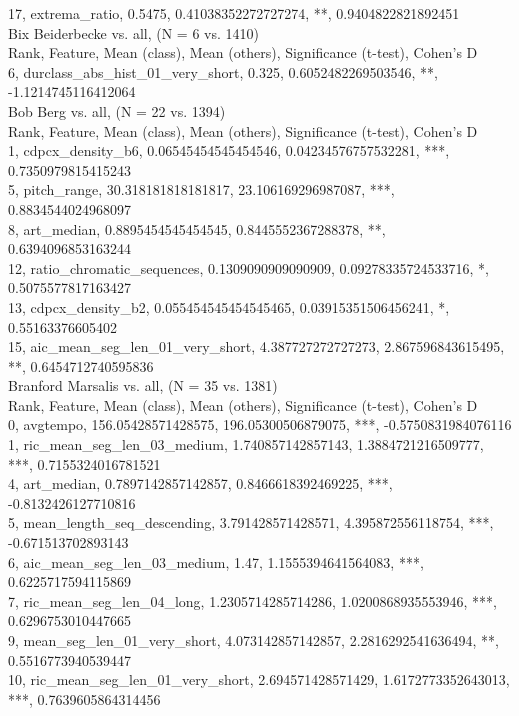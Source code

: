 17, extrema_ratio, 0.5475, 0.41038352272727274, **, 0.9404822821892451\\
Bix Beiderbecke vs. all, (N = 6 vs. 1410)\\
Rank, Feature, Mean (class), Mean (others), Significance (t-test), Cohen's D\\
6, durclass_abs_hist_01_very_short, 0.325, 0.6052482269503546, **, -1.1214745116412064\\
Bob Berg vs. all, (N = 22 vs. 1394)\\
Rank, Feature, Mean (class), Mean (others), Significance (t-test), Cohen's D\\
1, cdpcx_density_b6, 0.06545454545454546, 0.04234576757532281, ***, 0.7350979815415243\\
5, pitch_range, 30.318181818181817, 23.106169296987087, ***, 0.8834544024968097\\
8, art_median, 0.8895454545454545, 0.8445552367288378, **, 0.6394096853163244\\
12, ratio_chromatic_sequences, 0.1309090909090909, 0.09278335724533716, *, 0.5075577817163427\\
13, cdpcx_density_b2, 0.055454545454545465, 0.03915351506456241, *, 0.55163376605402\\
15, aic_mean_seg_len_01_very_short, 4.387727272727273, 2.867596843615495, **, 0.6454712740595836\\
Branford Marsalis vs. all, (N = 35 vs. 1381)\\
Rank, Feature, Mean (class), Mean (others), Significance (t-test), Cohen's D\\
0, avgtempo, 156.05428571428575, 196.05300506879075, ***, -0.5750831984076116\\
1, ric_mean_seg_len_03_medium, 1.740857142857143, 1.3884721216509777, ***, 0.7155324016781521\\
4, art_median, 0.7897142857142857, 0.8466618392469225, ***, -0.8132426127710816\\
5, mean_length_seq_descending, 3.791428571428571, 4.395872556118754, ***, -0.671513702893143\\
6, aic_mean_seg_len_03_medium, 1.47, 1.1555394641564083, ***, 0.6225717594115869\\
7, ric_mean_seg_len_04_long, 1.2305714285714286, 1.0200868935553946, ***, 0.6296753010447665\\
9, mean_seg_len_01_very_short, 4.073142857142857, 2.2816292541636494, **, 0.5516773940539447\\
10, ric_mean_seg_len_01_very_short, 2.694571428571429, 1.6172773352643013, ***, 0.7639605864314456\\

